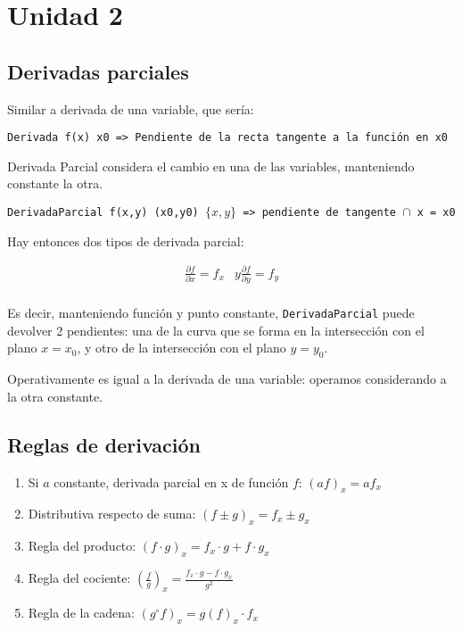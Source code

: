 \section{Unidad 2}

\subsection{Derivadas parciales}

Similar a derivada de una variable, que sería: 

\texttt{Derivada f(x) x0 => Pendiente de la recta tangente a la función en x0}

Derivada Parcial considera el cambio en una de las variables, manteniendo constante la otra.

\texttt{DerivadaParcial f(x,y) (x0,y0) \(\{x,y\}\) => pendiente de tangente \(\cap\) x = x0}

Hay entonces dos tipos de derivada parcial:

\begin{align*}
    \frac{\partial f}{\partial x} = f_x & y \frac{\partial f}{\partial y} = f_y \\
\end{align*}

Es decir,
manteniendo función y punto constante, 
\texttt{DerivadaParcial} puede devolver 2 pendientes:
una de la curva que se forma en la intersección con el plano \(x = x_0\),
y otro de la intersección con el plano \(y = y_0\).

Operativamente es igual a la derivada de una variable: operamos considerando a la otra constante.

\subsection{Reglas de derivación}

\begin{enumerate}
    \item Si \(a\) constante, derivada parcial en x de función \(f\): \((af)_x = af_x\)
    \item Distributiva respecto de suma: \((f \pm g)_x = f_x \pm g_x\)
    \item Regla del producto: \((f\cdot g)_x = f_x\cdot g + f\cdot g_x\)
    \item Regla del cociente: \(\left(\frac{f}{g}\right)_x = \frac{f_x\cdot g - f\cdot g_x}{g^{2}}\)
    \item Regla de la cadena: \((g^{\circ}f)_x = g(f)_x \cdot f_x\)
\end{enumerate}

